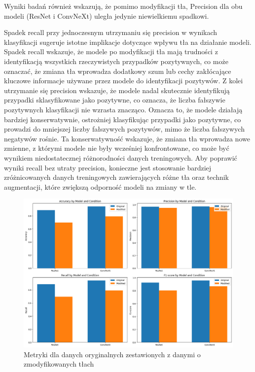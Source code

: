 Wyniki badań również wskazują, że pomimo modyfikacji tła, Precision dla obu modeli (ResNet i ConvNeXt) uległa jedynie niewielkiemu spadkowi.

Spadek recall przy jednoczesnym utrzymaniu się precision w wynikach klasyfikacji sugeruje istotne implikacje dotyczące wpływu tła na działanie modeli. Spadek recall wskazuje, że modele po modyfikacji tła mają trudności z identyfikacją 
wszystkich rzeczywistych przypadków pozytywnych, co może oznaczać, że zmiana tła wprowadza dodatkowy szum lub cechy zakłócające kluczowe informacje używane przez modele do identyfikacji pozytywów. Z kolei utrzymanie się 
precision wskazuje, że modele nadal skutecznie identyfikują przypadki sklasyfikowane jako pozytywne, co oznacza, że liczba fałszywie pozytywnych klasyfikacji nie wzrasta znacząco. Oznacza to, że modele działają bardziej 
konserwatywnie, ostrożniej klasyfikując przypadki jako pozytywne, co prowadzi do mniejszej liczby fałszywych pozytywów, mimo że liczba fałszywych negatywów rośnie. Ta konserwatywność wskazuje, że zmiana tła wprowadza nowe zmienne, 
z którymi modele nie były wcześniej konfrontowane, co może być wynikiem niedostatecznej różnorodności danych treningowych. Aby poprawić wyniki recall bez utraty precision, konieczne jest stosowanie bardziej zróżnicowanych danych 
treningowych zawierających różne tła oraz technik augmentacji, które zwiększą odporność modeli na zmiany w tle.

\begin{figure}
	\centering\includegraphics[width=.9\textwidth]{img/overall_metrics}
	\caption{Metryki dla danych oryginalnych zestawionych z danymi o zmodyfikowanych tłach}  
    \label{rys:overall_metrics}
\end{figure}


